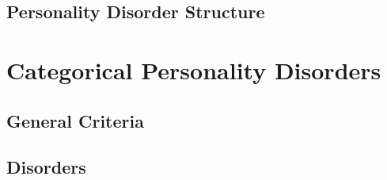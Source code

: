 \documentclass[xcolor=x11names,compress]{beamer}\usepackage[]{graphicx}\usepackage[]{color}
\renewcommand{\(}{\begin{columns}}
\renewcommand{\)}{\end{columns}}
\newcommand{\<}[1]{\begin{column}{#1}}
\renewcommand{\>}{\end{column}}
\begin{document}








\subsection{Personality Disorder Structure}

\section{Categorical Personality Disorders}

\subsection{General Criteria}



\subsection{Disorders}


\end{document}
